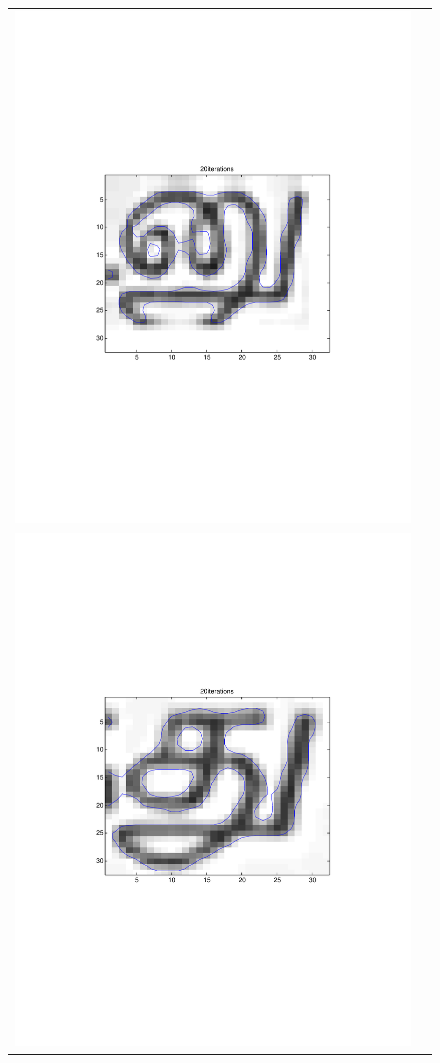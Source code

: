 \begin{center}
\begin{figure}
\begin{tabular}{ cc }
\includegraphics[scale=0.4]{./img/nu} \\ 
\includegraphics[scale=0.4]{./img/tu} &

\end{tabular}
\end{figure}
\end{center}
